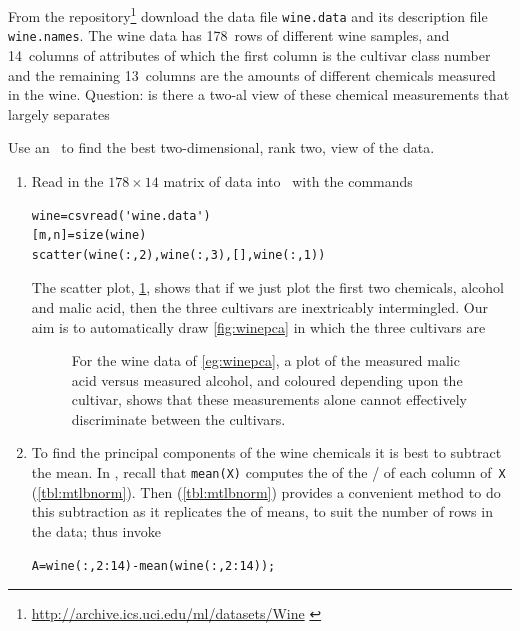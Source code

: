 \begin{example} \label{eg:winepca}
From the \cite{Dua2019} repository\footnote{\url{http://archive.ics.uci.edu/ml/datasets/Wine} \cite[]{Dua2019}} download the data file \verb|wine.data| and its description file \verb|wine.names|.
The wine data has 178~rows of different wine samples, and 14~columns of attributes of which the first column is the cultivar class number and the remaining 13~columns are the amounts of different chemicals measured in the wine.
Question: is there a two-al view of these chemical measurements that largely separates 

\begin{solution} 
Use an \svd\ to find the best two-dimensional, rank two, view of the data.
\begin{enumerate}
\item Read in the \(178\times14\) matrix of data into \script\ with the commands
\begin{verbatim}
wine=csvread('wine.data')
[m,n]=size(wine)
scatter(wine(:,2),wine(:,3),[],wine(:,1))
\end{verbatim}
\setbox\ajrqrbox\hbox{}%
\marginajrbox%
The scatter plot, \cref{fig:wine12}, shows that if we just plot the first two chemicals, alcohol and malic acid, then the three cultivars are inextricably intermingled.
Our aim is to automatically draw \cref{fig:winepca} in which the three cultivars are 
\begin{figure}
\centering

\caption{For the wine data of \cref{eg:winepca}, a plot of the measured malic acid versus measured alcohol, and coloured depending upon the cultivar, shows that these measurements alone cannot effectively discriminate between the cultivars.}
\label{fig:wine12}
\end{figure}


\item To find the principal components of the wine chemicals it is best to subtract the mean.
In \script, recall that \verb|mean(X)| computes the  of the \slash {} of each column of~\verb|X| (\cref{tbl:mtlbnorm}).
Then  (\cref{tbl:mtlbnorm}) provides a convenient method to do this subtraction as it replicates the  of means, to suit the number of rows in the data; thus invoke
\begin{verbatim}
A=wine(:,2:14)-mean(wine(:,2:14));
\end{verbatim}


\end{enumerate}
\end{solution}
\end{example}
